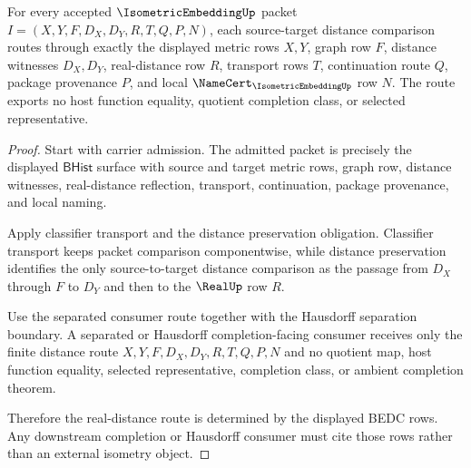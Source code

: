 \begin{theorem}
\label{thm:isometric-embedding-real-distance-route-determinacy}
For every accepted $\IsometricEmbeddingUp$ packet $I=(X,Y,F,D_X,D_Y,R,T,Q,P,N)$, each source-target distance comparison routes through exactly the displayed metric rows $X,Y$, graph row $F$, distance witnesses $D_X,D_Y$, real-distance row $R$, transport rows $T$, continuation route $Q$, package provenance $P$, and local $\NameCert_{\IsometricEmbeddingUp}$ row $N$. The route exports no host function equality, quotient completion class, or selected representative.
\end{theorem}
\begin{proof}
Start with carrier admission. The admitted packet is precisely the displayed $\mathsf{BHist}$ surface with source and target metric rows, graph row, distance witnesses, real-distance reflection, transport, continuation, package provenance, and local naming.

Apply classifier transport and the distance preservation obligation. Classifier transport keeps packet comparison componentwise, while distance preservation identifies the only source-to-target distance comparison as the passage from $D_X$ through $F$ to $D_Y$ and then to the $\RealUp$ row $R$.

Use the separated consumer route together with the Hausdorff separation boundary. A separated or Hausdorff completion-facing consumer receives only the finite distance route $X,Y,F,D_X,D_Y,R,T,Q,P,N$ and no quotient map, host function equality, selected representative, completion class, or ambient completion theorem.

Therefore the real-distance route is determined by the displayed BEDC rows. Any downstream completion or Hausdorff consumer must cite those rows rather than an external isometry object.
\end{proof}

